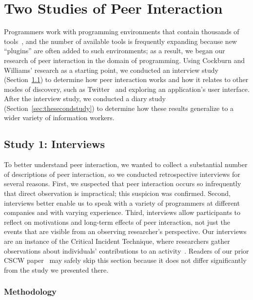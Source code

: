 \documentclass[smallextended]{svjour3}
\newcommand\discovery{peer interaction\xspace}
\newcommand\DisCovery{Peer Interaction\xspace}
\begin{document}
\section{Two Studies of \DisCovery}\label{sec:practice}

\noindent
Programmers work with programming environments that contain thousands
of tools~\cite{murphyHill12c}, and the number of available tools is frequently expanding 
because new ``plugins'' are often added to such environments;
as a result, we began our research of \discovery in the domain of programming.
Using Cockburn and Williams' research as a starting point, we conducted 
an interview study (Section~\ref{sec:thefirststudy})
to determine how \discovery works and how it relates to other
modes of discovery, such as Twitter~\cite{twitter} and exploring an application's user
interface. 
After the interview study, we conducted a diary study 
(Section~\ref{sec:thesecondstudy})
to determine how these results generalize
to a wider variety of information workers.

\subsection{Study 1: Interviews}\label{sec:thefirststudy}

\noindent
To better understand \discovery, we wanted to collect a substantial number of
descriptions of \discovery, so
we conducted retrospective interviews
for several reasons.
First, we suspected that \discovery occurs so infrequently that
direct observation is impractical; this suspicion was confirmed.
Second, interviews better enable us to speak with a variety of programmers at
different companies and with varying experience.
Third, interviews allow participants to reflect on motivations and long-term
effects of \discovery, not just the events that are visible from an
observing researcher's perspective.
Our interviews are an instance of the Critical Incident Technique, where
researchers gather observations about individuals' contributions to 
an activity~\cite{flanagan1954critical}. 
Readers of our prior CSCW paper~\cite{murphy-hill11:peer} may safely skip
this section because it does not differ significantly from the study we presented
there.

\subsubsection{Methodology}
\end{document}

